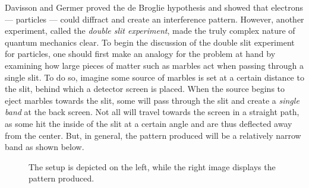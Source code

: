 Davisson and Germer proved the de Broglie hypothesis and showed that electrons --- particles --- could diffract and create an interference pattern. However, another experiment, called the \emph{double slit experiment}, made the truly complex nature of quantum mechanics clear. To begin the discussion of the double slit experiment for particles, one should first make an analogy for the problem at hand by examining how large pieces of matter such as marbles act when passing through a single slit. To do so, imagine some source of marbles is set at a certain distance to the slit, behind which a detector screen is placed. When the source begins to eject marbles towards the slit, some will pass through the slit and create a \emph{single band} at the back screen. Not all will travel towards the screen in a straight path, as some hit the inside of the slit at a certain angle and are thus deflected away from the center. But, in general, the pattern produced will be a relatively narrow band as shown below.

\begin{figure}[h!]
	\centering
	\hspace{1cm}
	\caption*{The setup is depicted on the left, while the right image displays the pattern produced.}
\end{figure}

